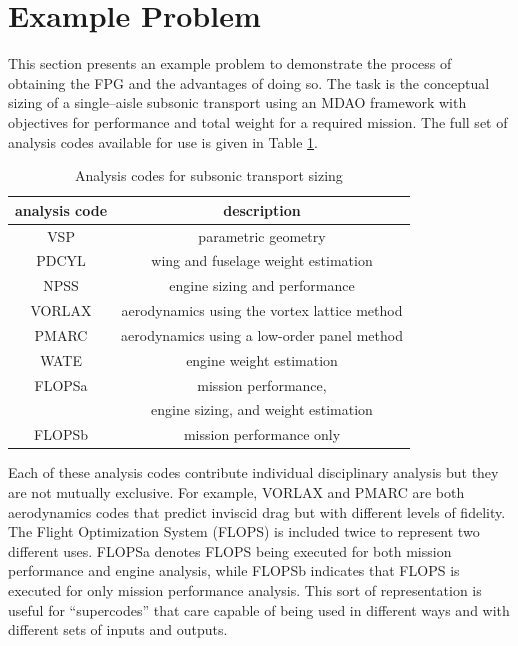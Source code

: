 \section{Example Problem}
This section presents an example problem to demonstrate the process of obtaining the FPG and the advantages of doing so. The task is the conceptual sizing of a single--aisle subsonic transport using an MDAO framework with objectives for performance and total weight for a required mission. The full set of analysis codes available for use is given in Table \ref{t:analysis codes}.
\begin{table}[htbp]
  \centering
  \caption{Analysis codes for subsonic transport sizing}
    \begin{tabular}{cc}
    \toprule
    analysis code & description \\
    \midrule
    VSP   & parametric geometry \\
    PDCYL & wing and fuselage weight estimation \\
    NPSS  & engine sizing and performance \\
    VORLAX & aerodynamics using the vortex lattice method \\
    PMARC & aerodynamics using a low-order panel method \\
    WATE  & engine weight estimation \\
    FLOPSa & mission performance, \\
      & engine sizing, and weight estimation \\
    FLOPSb & mission performance only \\
    \bottomrule
    \end{tabular}%
  \label{t:analysis codes}%
\end{table}%
Each of these analysis codes contribute individual disciplinary analysis but they are not mutually exclusive. For example, VORLAX and PMARC are both aerodynamics codes that predict inviscid drag but with different levels of fidelity. The Flight Optimization System (FLOPS) is included twice to represent two different uses. FLOPSa denotes FLOPS being executed for both mission performance and engine analysis, while FLOPSb indicates that FLOPS is executed for only mission performance analysis. This sort of representation is useful for ``supercodes'' that care capable of being used in different ways and with different sets of inputs and outputs.

